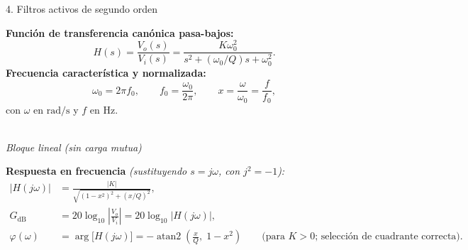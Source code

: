 \documentclass[10pt, a4paper]{article}
\begin{document}
\begin{formulabox}{4. Filtros activos de segundo orden}
    \begin{minipage}[t]{0.66\textwidth}
        \textbf{Función de transferencia canónica pasa-bajos:}
        \begin{equation}
            H(s) = \frac{V_o(s)}{V_i(s)} = \frac{K\omega_0^2}{s^2 + (\omega_0/Q)s + \omega_0^2}. \label{eq:hs_canon}
        \end{equation}
        \textbf{Frecuencia característica y normalizada:}
        \begin{equation}
            \omega_0 = 2\pi f_0, \qquad f_0 = \frac{\omega_0}{2\pi}, \qquad x = \frac{\omega}{\omega_0} = \frac{f}{f_0}, \label{eq:w0_x}
        \end{equation}
        con $\omega$ en $\mathrm{rad/s}$ y $f$ en $\mathrm{Hz}$.
    \end{minipage}%
    \hfill
    \begin{minipage}[t]{0.31\textwidth}
        \centering
        \vspace{0.35cm}
        \\[0.1cm]
        {\scriptsize\textit{Bloque lineal (sin carga mutua)}}
    \end{minipage}

    \vspace{0.15cm}
    \textbf{Respuesta en frecuencia} \textit{(sustituyendo $s = j\omega$, con $j^2 = -1$):}
    \begin{align}
        |H(j\omega)| &= \frac{|K|}{\sqrt{(1 - x^2)^2 + (x/Q)^2}}, \label{eq:mag} \\[3pt]
        G_{\mathrm{dB}} &= 20\log_{10}\left|\frac{V_o}{V_i}\right| = 20\log_{10}|H(j\omega)|, \label{eq:gdb} \\[3pt]
        \varphi(\omega) &= \arg\big[H(j\omega)\big] = -\operatorname{atan2}\!\left(\frac{x}{Q},\; 1 - x^2\right) \qquad \text{(para $K > 0$; selección de cuadrante correcta)}. \label{eq:fase}
    \end{align}


\end{formulabox}
\end{document}
